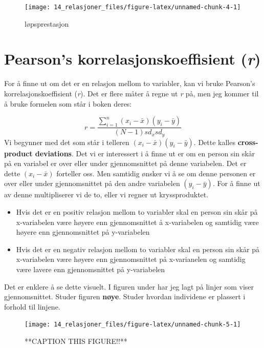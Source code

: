 \documentclass[
]{book}
\providecommand{\tightlist}{%
  \setlength{\itemsep}{0pt}\setlength{\parskip}{0pt}}
\begin{document}
\begin{figure}

{\centering \texttt{[image: 14\_relasjoner\_files/figure-latex/unnamed-chunk-4-1]} 

}

\caption{løpsprestasjon}\label{fig:unnamed-chunk-4}
\end{figure}

\hypertarget{pearsons-korrelasjonskoeffisient-r}{%
\section{\texorpdfstring{Pearson's korrelasjonskoeffisient (\emph{r})}{Pearson's korrelasjonskoeffisient (r)}}\label{pearsons-korrelasjonskoeffisient-r}}

For å finne ut om det er en relasjon mellom to variabler, kan vi bruke Pearson's korrelasjonskoeffisient (\emph{r}). Det er flere måter å regne ut \emph{r} på, men jeg kommer til å bruke formelen som står i boken deres:

\[
r = \frac{\sum_{i=1}^{n}(x_i -\bar{x})(y_i -\bar{y})} {(N-1)sd_xsd_y}
\]
Vi begynner med det som står i telleren \((x_i -\bar{x})(y_i -\bar{y})\). Dette kalles \textbf{cross-product deviations}. Det vi er interessert i å finne ut er om en person sin skår på en variabel er over eller under gjennomsnittet på denne variabelen. Det er dette \((x_i -\bar{x})\) forteller oss. Men samtidig ønsker vi å se om denne personen er over eller under gjennomsnittet på den andre variabelen \((y_i -\bar{y})\). For å finne ut av denne multipliserer vi de to, eller vi regner ut kryssproduktet.

\begin{itemize}
\tightlist
\item
  Hvis det er en positiv relasjon mellom to variabler skal en person sin skår på x-variabelen være høyere enn gjennomsnittet å x-variabelen og samtidig være høyere enn gjennomsnittet på y-variabelen
\item
  Hvis det er en negativ relasjon mellom to variabler skal en person sin skår på x-variabelen være høyere enn gjennomsnittet på x-varianelen og samtidig være lavere enn gjennomsnittet på y-variabelen
\end{itemize}

Det er enklere å se dette visuelt. I figuren under har jeg lagt på linjer som viser gjennomsnittet. Studer figuren \textbf{nøye}. Studer hvordan individene er plassert i forhold til linjene.

\begin{figure}

{\centering \texttt{[image: 14\_relasjoner\_files/figure-latex/unnamed-chunk-5-1]} 

}

\caption{**CAPTION THIS FIGURE!!**}\label{fig:unnamed-chunk-5}
\end{figure}
\end{document}
